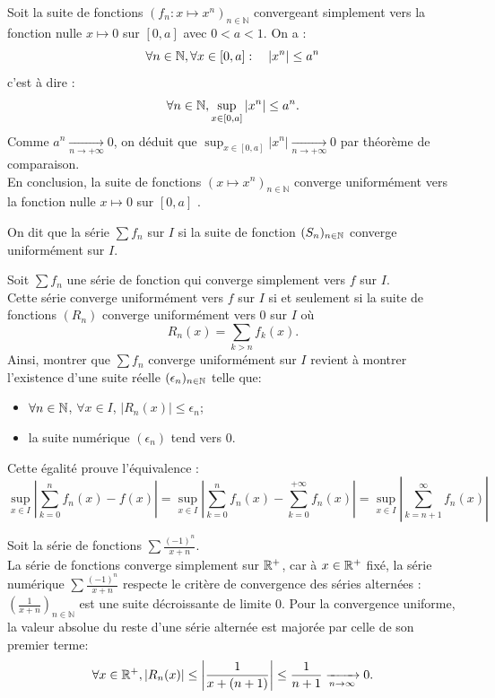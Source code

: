 \documentclass{book}
\newcommand{\Sfn}{\sum f_n}
\begin{document}
\begin{Exemple}[Méthode 2]
Soit la suite de fonctions $(f_n:x\mapsto x^n)_{n\in \mathbb{N}}$ convergeant simplement vers la fonction nulle $x\mapsto 0$ sur $[0,a]$ avec $0<a<1$. On a :
$$\forall n\in \mathbb{N}, \forall x\in[0,a]:\quad |x^n|\leq a^n$$ c'est à dire :
$$ \forall n\in \mathbb{N}, \sup_{x\in[0,a]}|x^n|\leq a^n.$$
Comme $a^n\xrightarrow[n\to+\infty]{}0$, on déduit que $\sup_{x\in[0,a]}|x^n| \xrightarrow[n\to+\infty]{}0$ par théorème de comparaison. \\
En conclusion, la suite de fonctions $(x\mapsto x^n)_{n\in \mathbb{N}}$ converge uniformément vers la fonction nulle $x\mapsto 0$ sur $[0,a]$ .
\end{Exemple}


\begin{Definition}[Convergence uniforme $\Sfn$]
On dit que la série $\Sfn$  sur $I$ si  la suite de fonction $(S_n)_{n\in \mathbb{N}   }$ converge uniformément sur $I$.
\end{Definition}
\begin{Proposition}
Soit $\Sfn$ une série de fonction qui converge simplement vers $f$ sur $I$.\\
Cette série converge uniformément vers $f$ sur $I$ si et seulement si
la suite de fonctions $(R_n)$ converge uniformément vers $0$ sur $I$
où \[ R_n(x) = \sum _{k>n} f_k(x). \]
Ainsi, montrer que $\Sfn$ converge uniformément sur $I$ revient à montrer
l'existence d'une suite réelle $(\epsilon_n)_{n\in \mathbb{N}   }$ telle que:
  \begin{itemize}
  \item
    $\forall  n\in \mathbb{N}   $, $\forall  x\in I$, $\left|R_n(x)\right| \leq \epsilon_n$;
  \item
    la suite numérique $(\epsilon_n)$ tend vers $0$.
  \end{itemize}
\end{Proposition}
\begin{Demonstration}
Cette égalité prouve l'équivalence :
 $$ \sup_{x\in I}\left|\sum_{k=0}^{n} f_n(x) - f(x)\right| = \sup_{x\in I}\left|\sum_{k=0}^{n} f_n(x) - \sum_{k=0}^{+\infty}f_n(x)\right|=\sup_{x\in I}\left|\sum_{k=n+1}^{\infty} f_n(x)\right|  $$ 
\end{Demonstration}

\begin{Exemple} Soit la série de fonctions $\sum \frac{(-1)^n}{x+n}$.\\
La série de fonctions converge simplement sur $\mathbb{R}^+$, car à $x\in\mathbb{R}^+ $ fixé, la série numérique $\sum \frac{(-1)^n}{x+n}$ respecte le critère de convergence des séries alternées : $(\frac{1}{x+n})_{n\in\mathbb{N}}$ est une suite décroissante de limite 0. Pour la convergence uniforme, la valeur absolue du reste d'une série alternée est majorée par celle de son premier terme:
$$\forall  x\in \mathbb{R} ^+,\left|R_n(x)\right| \leq  \left|\frac{1}{x+(n+1)}\right|\leq \frac{1}{n+1}\xrightarrow[{n\to \infty}]{} 0.$$
\end{Exemple}
% 
\end{document}
